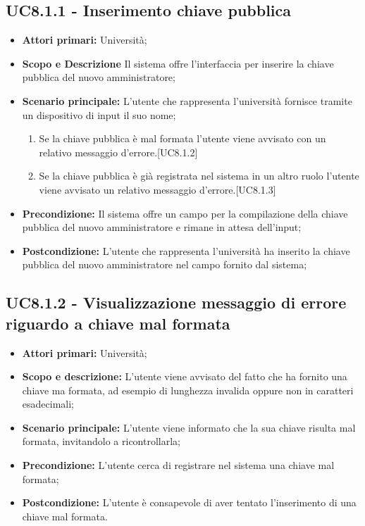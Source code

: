 \documentclass[AnalisiDeiRequisiti.tex]{subfiles}
\begin{document}
\subsection{UC8.1.1 - Inserimento chiave pubblica}
\begin{itemize}
	\item \textbf{Attori primari:} Università;\\
	\item \textbf{Scopo e Descrizione} Il sistema offre l'interfaccia per inserire la chiave pubblica del nuovo amministratore;
	\item \textbf{Scenario principale:} L'utente che rappresenta l'università fornisce tramite un dispositivo di input il suo nome;	\begin{enumerate}
		\item Se la chiave pubblica è mal formata l'utente viene avvisato con un relativo messaggio d'errore.[UC8.1.2]
		\item Se la chiave pubblica è già registrata nel sistema in un altro ruolo l'utente viene avvisato un relativo messaggio d'errore.[UC8.1.3]
	\end{enumerate}
	\item \textbf{Precondizione:} Il sistema offre un campo per la compilazione della chiave pubblica del nuovo amministratore e rimane in attesa dell'input;
	\item \textbf{Postcondizione:} L'utente che rappresenta l'università ha inserito la chiave pubblica del nuovo amministratore nel campo fornito dal sistema;
\end{itemize}
\subsection{UC8.1.2 - Visualizzazione messaggio di errore riguardo a chiave mal formata}
\begin{itemize}
	\item \textbf{Attori primari:} Università;\\
	\item \textbf{Scopo e descrizione:} L'utente viene avvisato del fatto che ha fornito una chiave ma formata, ad esempio di lunghezza invalida oppure non in caratteri esadecimali;\\
	\item \textbf{Scenario principale:} L'utente viene informato che la sua chiave risulta mal formata, invitandolo a ricontrollarla;\\
	\item \textbf{Precondizione:} L'utente cerca di registrare nel sistema una chiave mal formata;\\
	\item \textbf{Postcondizione:} L'utente è consapevole di aver tentato l'inserimento di una chiave mal formata.\\
\end{itemize}
\end{document}
